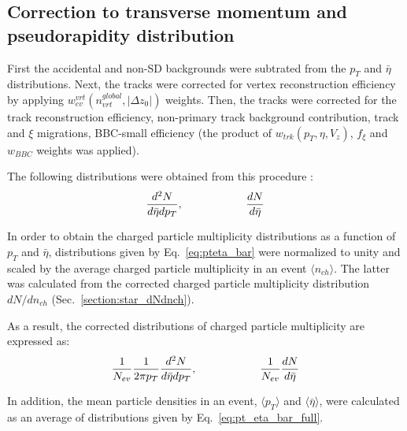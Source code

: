 \subsection{Correction to transverse momentum and pseudorapidity distribution}\label{section:star_dNdeta_dNdpt}
First the accidental and non-SD backgrounds were subtrated from the $p_T$ and $\bar{\eta}$ distributions. Next, the tracks were  corrected for vertex reconstruction efficiency by applying $w_{ev}^{vrt}(n_{vrt}^{global},|\Delta z_0|)$ weights. Then, the tracks were corrected for the track reconstruction efficiency, non-primary track background contribution, track and $\xi$ migrations, BBC-small efficiency (the product of $w_{trk}(p_T,\eta,V_z)$, $f_\xi$ and $w_{BBC}$ weights was applied). 


The following distributions were obtained from this procedure :
\begin{equation}
\frac{d^2N}{d\bar{\eta}dp_T},\textrm{\hspace{2cm}} \frac{dN}{d\bar{\eta}}
\label{eq:pteta_bar}
\end{equation}

In order to obtain the charged particle multiplicity distributions as a function of $p_T$ and $\bar{\eta}$,  distributions given by Eq.~\ref{eq:pteta_bar} were normalized to unity and scaled by the average charged particle multiplicity in an event $\langle n_{ch}\rangle$. The latter was calculated from the corrected charged particle multiplicity distribution $dN/dn_{ch}$ (Sec.~\ref{section:star_dNdnch}).

As a result, the corrected distributions of charged particle multiplicity are expressed as:
 \begin{equation}
 \frac{1}{N_{ev}}\frac{1}{2\pi p_T}\frac{d^2N}{d\bar{\eta}dp_T},\textrm{\hspace{2cm}} \frac{1}{N_{ev}}\frac{dN}{d\bar{\eta}}
 \label{eq:pt_eta_bar_full}
 \end{equation}
 
 In addition, the mean particle densities in an event, $\langle p_T\rangle$ and $\langle \bar{\eta}\rangle$, were calculated as an average of distributions given by Eq.~\ref{eq:pt_eta_bar_full}.